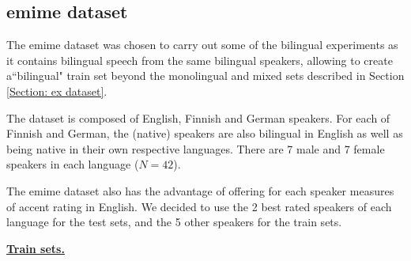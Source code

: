 \subsection{\acrshort{emime} dataset} \label{Section: emime dataset}

\par The \acrfull{emime} dataset \citep{wester2010emime} was chosen to carry out some of the bilingual experiments as it contains bilingual speech from the same bilingual speakers, allowing to create a``bilingual" train set beyond the monolingual and mixed sets described in Section \ref{Section: ex dataset}. 

\par The dataset is composed of English, Finnish and German speakers. For each of Finnish and German, the (native) speakers are also bilingual in English as well as being native in their own respective languages. There are 7 male and 7 female speakers in each language ($N=42$). 
\par The \acrshort{emime} dataset also has the advantage of offering for each speaker measures of accent rating in English. We decided to use the 2 best rated speakers of each language for the test sets, and the 5 other speakers for the train sets. 



\bigskip

\par \noindent \textbf{\underline{Train sets.}}

\smallskip 

